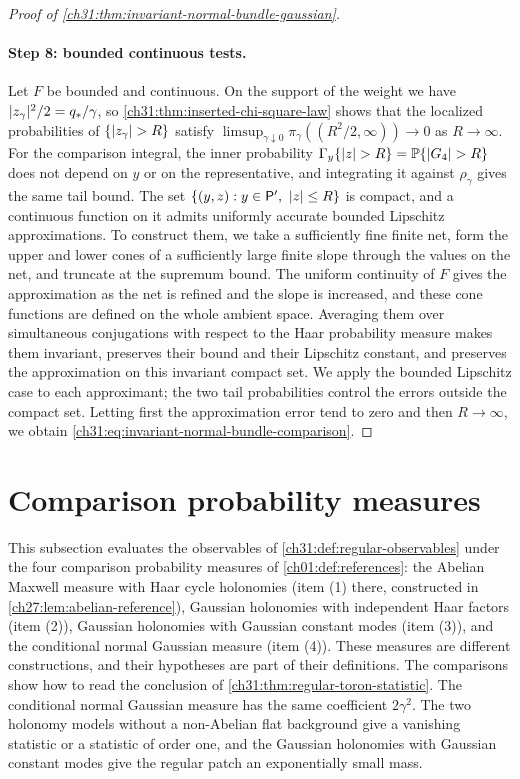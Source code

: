 \begin{proof}[Proof of \cref{ch31:thm:invariant-normal-bundle-gaussian}]
\paragraph{Step 8: bounded continuous tests.}
Let $F$ be bounded and continuous. On the support of the weight we have $\lvert z_\gamma\rvert^2/2=q_*/\gamma$, so \cref{ch31:thm:inserted-chi-square-law} shows that the localized probabilities of $\{\lvert z_\gamma\rvert>R\}$ satisfy $\limsup_{\gamma\downarrow0}\pi_\gamma((R^2/2,\infty))\to0$ as $R\to\infty$. For the comparison integral, the inner probability $\Gamma_y\{\lvert z\rvert>R\}=\mathbb P\{\lvert G_4\rvert>R\}$ does not depend on $y$ or on the representative, and integrating it against $\rho_\gamma$ gives the same tail bound. The set $\{(y,z):y\in\mathsf P',\ \lvert z\rvert\le R\}$ is compact, and a continuous function on it admits uniformly accurate bounded Lipschitz approximations. To construct them, we take a sufficiently fine finite net, form the upper and lower cones of a sufficiently large finite slope through the values on the net, and truncate at the supremum bound. The uniform continuity of $F$ gives the approximation as the net is refined and the slope is increased, and these cone functions are defined on the whole ambient space. Averaging them over simultaneous conjugations with respect to the Haar probability measure makes them invariant, preserves their bound and their Lipschitz constant, and preserves the approximation on this invariant compact set. We apply the bounded Lipschitz case to each approximant; the two tail probabilities control the errors outside the compact set. Letting first the approximation error tend to zero and then $R\to\infty$, we obtain \eqref{ch31:eq:invariant-normal-bundle-comparison}.
\end{proof}

\section{Comparison probability measures}\label{ch31:sec:references}

This subsection evaluates the observables of \cref{ch31:def:regular-observables} under the four comparison probability measures of \cref{ch01:def:references}: the Abelian Maxwell measure with Haar cycle holonomies (item (1) there, constructed in \cref{ch27:lem:abelian-reference}), Gaussian holonomies with independent Haar factors (item (2)), Gaussian holonomies with Gaussian constant modes (item (3)), and the conditional normal Gaussian measure (item (4)). These measures are different constructions, and their hypotheses are part of their definitions. The comparisons show how to read the conclusion of \cref{ch31:thm:regular-toron-statistic}. The conditional normal Gaussian measure has the same coefficient $2\gamma^2$. The two holonomy models without a non-Abelian flat background give a vanishing statistic or a statistic of order one, and the Gaussian holonomies with Gaussian constant modes give the regular patch an exponentially small mass.

